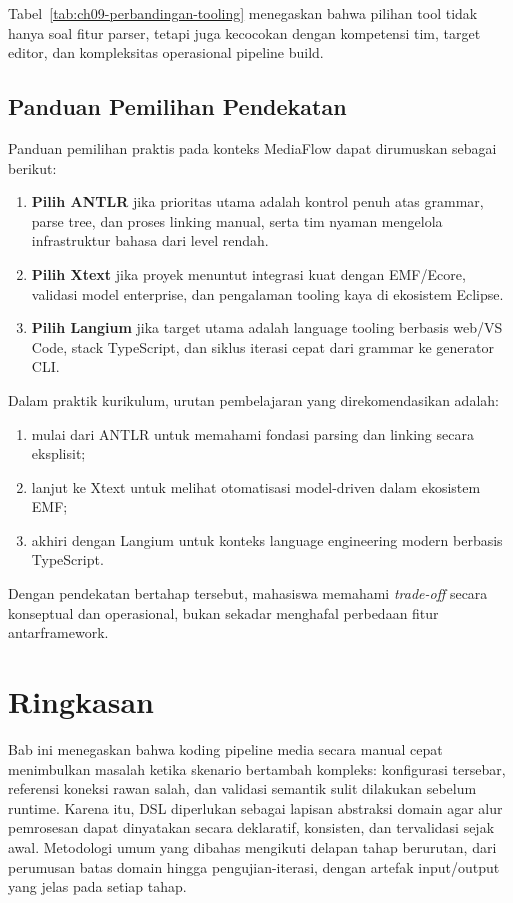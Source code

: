 Tabel~\ref{tab:ch09-perbandingan-tooling} menegaskan bahwa pilihan tool tidak hanya soal fitur parser, tetapi juga kecocokan dengan kompetensi tim, target editor, dan kompleksitas operasional pipeline build.

\subsection{Panduan Pemilihan Pendekatan}

Panduan pemilihan praktis pada konteks MediaFlow dapat dirumuskan sebagai berikut:
\begin{enumerate}
  \item \textbf{Pilih ANTLR} jika prioritas utama adalah kontrol penuh atas grammar, parse tree, dan proses linking manual, serta tim nyaman mengelola infrastruktur bahasa dari level rendah.
  \item \textbf{Pilih Xtext} jika proyek menuntut integrasi kuat dengan EMF/Ecore, validasi model enterprise, dan pengalaman tooling kaya di ekosistem Eclipse.
  \item \textbf{Pilih Langium} jika target utama adalah language tooling berbasis web/VS Code, stack TypeScript, dan siklus iterasi cepat dari grammar ke generator CLI.
\end{enumerate}

Dalam praktik kurikulum, urutan pembelajaran yang direkomendasikan adalah:
\begin{enumerate}
  \item mulai dari ANTLR untuk memahami fondasi parsing dan linking secara eksplisit;
  \item lanjut ke Xtext untuk melihat otomatisasi model-driven dalam ekosistem EMF;
  \item akhiri dengan Langium untuk konteks language engineering modern berbasis TypeScript.
\end{enumerate}

Dengan pendekatan bertahap tersebut, mahasiswa memahami \textit{trade-off} secara konseptual dan operasional, bukan sekadar menghafal perbedaan fitur antarframework.

\section{Ringkasan}

Bab ini menegaskan bahwa koding pipeline media secara manual cepat menimbulkan masalah ketika skenario bertambah kompleks: konfigurasi tersebar, referensi koneksi rawan salah, dan validasi semantik sulit dilakukan sebelum runtime. Karena itu, DSL diperlukan sebagai lapisan abstraksi domain agar alur pemrosesan dapat dinyatakan secara deklaratif, konsisten, dan tervalidasi sejak awal. Metodologi umum yang dibahas mengikuti delapan tahap berurutan, dari perumusan batas domain hingga pengujian-iterasi, dengan artefak input/output yang jelas pada setiap tahap.

